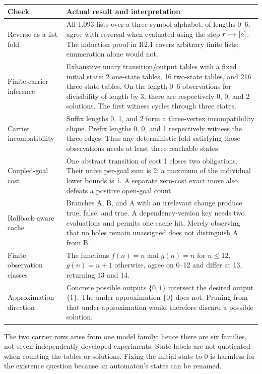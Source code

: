 \begin{longtable}{@{}p{.25\linewidth}p{.69\linewidth}@{}}
\toprule
Check & Actual result and interpretation\\
\midrule
\endhead
Reverse as a list fold & All 1,093 lists over a three-symbol alphabet, of lengths 0--6, agree with reversal when evaluated using the step $r\mathbin{+\!+}[a]$. The induction proof in R2.1 covers arbitrary finite lists; enumeration alone would not.\\
Finite carrier inference & Exhaustive unary transition/output tables with a fixed initial state: 2 one-state tables, 16 two-state tables, and 216 three-state tables. On the length-0--6 observations for divisibility of length by 3, there are respectively 0, 0, and 2 solutions. The first witness cycles through three states.\\
Carrier incompatibility & Suffix lengths 0, 1, and 2 form a three-vertex incompatibility clique. Prefix lengths 0, 0, and 1 respectively witness the three edges. Thus any deterministic fold satisfying those observations needs at least three reachable states.\\
Coupled-goal cost & One abstract transition of cost 1 closes two obligations. Their naive per-goal sum is 2; a maximum of the individual lower bounds is 1. A separate zero-cost exact move also defeats a positive open-goal count.\\
Rollback-aware cache & Branches A, B, and A with an irrelevant change produce true, false, and true. A dependency-version key needs two evaluations and permits one cache hit. Merely observing that no holes remain unassigned does not distinguish A from B.\\
Finite observation classes & The functions $f(n)=n$ and $g(n)=n$ for $n\leq12$, $g(n)=n+1$ otherwise, agree on 0--12 and differ at 13, returning 13 and 14.\\
Approximation direction & Concrete possible outputs $\{0,1\}$ intersect the desired output $\{1\}$. The under-approximation $\{0\}$ does not. Pruning from that under-approximation would therefore discard a possible solution.\\
\bottomrule
\end{longtable}

The two carrier rows arise from one model family; hence there are six families, not seven independently developed experiments. State labels are not quotiented when counting the tables or solutions. Fixing the initial state to 0 is harmless for the existence question because an automaton's states can be renamed.

